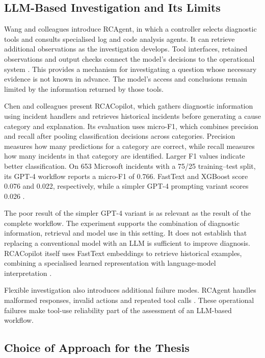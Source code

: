 \subsection{LLM-Based Investigation and Its Limits}

Wang and colleagues introduce RCAgent, in which a controller selects diagnostic
tools and consults specialised log and code analysis agents. It can
retrieve additional observations as the investigation develops. Tool
interfaces, retained observations and output checks connect the model's
decisions to the operational system
\parencite[Sections~2--3]{wang2024rcagent}. This provides a mechanism for
investigating a question whose necessary evidence is not known in advance.
The model's access and conclusions remain limited by the information
returned by those tools.

Chen and colleagues present RCACopilot, which gathers diagnostic information using
incident handlers and retrieves historical incidents before generating a
cause category and explanation. Its evaluation uses micro-F1, which combines
precision and recall after pooling classification decisions across
categories. Precision measures how many predictions for a category are
correct, while recall measures how many incidents in that category are
identified. Larger F1 values indicate better classification. On 653 Microsoft
incidents with a 75/25 training--test split, its GPT-4 workflow reports a
micro-F1 of 0.766. FastText and XGBoost score 0.076 and 0.022, respectively,
while a simpler GPT-4 prompting variant scores 0.026
\parencite[Sections~5.1--5.3, Table~2]{chen2024rcacopilot}.

The poor result of the simpler GPT-4 variant is as relevant as the result
of the complete workflow. The experiment supports the combination of
diagnostic information, retrieval and model use in this setting. It does
not establish that replacing a conventional model with an LLM is sufficient
to improve diagnosis. RCACopilot itself uses FastText embeddings to retrieve
historical examples, combining a specialised learned representation with
language-model interpretation
\parencite[Section~4.2]{chen2024rcacopilot}.

Flexible investigation also introduces additional failure modes. RCAgent
handles malformed responses, invalid actions and repeated tool calls
\parencite[Sections~2--3]{wang2024rcagent}. These operational failures make
tool-use reliability part of the assessment of an LLM-based workflow.

\subsection{Choice of Approach for the Thesis}

